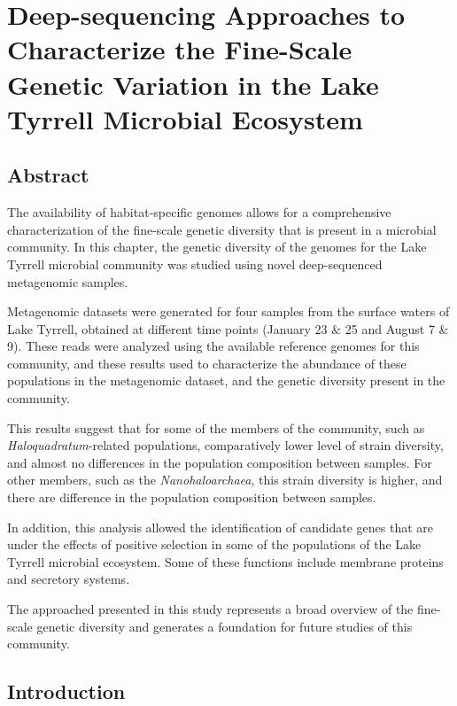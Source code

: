 \chapter{Deep-sequencing Approaches to Characterize the Fine-Scale Genetic Variation in the Lake Tyrrell Microbial Ecosystem}

\section{Abstract}

The availability of habitat-specific genomes allows for a comprehensive characterization of the fine-scale genetic diversity that is present in a microbial community. In this chapter, the genetic diversity of the genomes for the Lake Tyrrell microbial community was studied using novel deep-sequenced metagenomic samples.

Metagenomic datasets were generated for four samples from the surface waters of Lake Tyrrell, obtained at different time points (January 23 \& 25 and August 7 \& 9). These reads were analyzed using the available reference genomes for this community, and these results used to characterize the abundance of these populations in the metagenomic dataset, and the genetic diversity present in the community.

This results suggest that for some of the members of the community, such as \textit{Haloquadratum}-related populations, comparatively lower level of strain diversity, and almost no differences in the population composition between samples. For other members, such as the \textit{Nanohaloarchaea}, this strain diversity is higher, and there are difference in the population composition between samples.

In addition, this analysis allowed the identification of candidate genes that are under the effects of positive selection in some of the populations of the Lake Tyrrell microbial ecosystem. Some of these functions include membrane proteins and secretory systems.

The approached presented in this study represents a broad overview of the fine-scale genetic diversity and generates a foundation for future studies of this community.


\section{Introduction}

